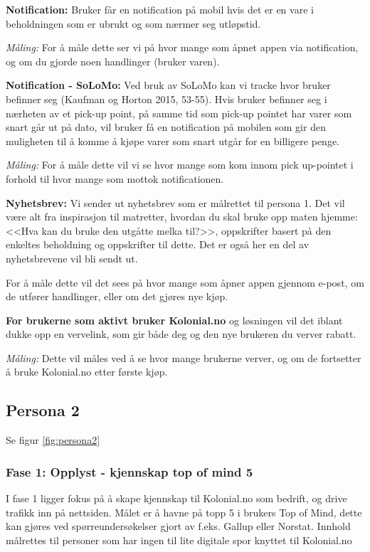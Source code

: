 \textbf{Notification:} Bruker får en notification på mobil hvis det er en vare i beholdningen som er ubrukt og som nærmer seg utløpstid. 

\textit{Måling:} For å måle dette ser vi på hvor mange som åpnet appen via notification, og om du gjorde noen handlinger (bruker varen). 

\textbf{Notification - SoLoMo:} Ved bruk av SoLoMo kan vi tracke hvor bruker befinner seg (Kaufman og Horton 2015, 53-55). Hvis bruker befinner seg i nærheten av et pick-up point, på samme tid som pick-up pointet har varer som snart går ut på dato, vil bruker få en notification på mobilen som gir den muligheten til å komme å kjøpe varer som snart utgår for en billigere penge. 

\textit{Måling:} For å måle dette vil vi se hvor mange som kom innom pick up-pointet i forhold til hvor mange som mottok notificationen. 

\textbf{Nyhetsbrev:} Vi sender ut nyhetsbrev som er målrettet til persona 1. Det vil være alt fra inspirasjon til matretter, hvordan du skal bruke opp maten hjemme: <<Hva kan du bruke den utgåtte melka til?>>, oppskrifter basert på den enkeltes beholdning og oppskrifter til dette. Det er også her en del av nyhetsbrevene vil bli sendt ut. 

For å måle dette vil det sees på hvor mange som åpner appen gjennom e-post, om de utfører handlinger, eller om det gjøres nye kjøp.

\textbf{For brukerne som aktivt bruker Kolonial.no} og løsningen vil det iblant dukke opp en vervelink, som gir både deg og den nye brukeren du verver rabatt.

\textit{Måling:} Dette vil måles ved å se hvor mange brukerne verver, og om de fortsetter å bruke Kolonial.no etter første kjøp.


\subsection{\textbf{Persona 2}}
\label{sec:persona2}
Se figur \ref{fig:persona2}

\subsubsection{\textbf{Fase 1: Opplyst - kjennskap top of mind 5 }}
I fase 1 ligger fokus på å skape kjennskap til Kolonial.no som bedrift, og drive trafikk inn på nettsiden. Målet er å havne på topp 5 i brukers Top of Mind, dette kan gjøres ved spørreundersøkelser gjort av f.eks. Gallup eller Norstat. Innhold målrettes til personer som har ingen til lite digitale spor knyttet til Kolonial.no


